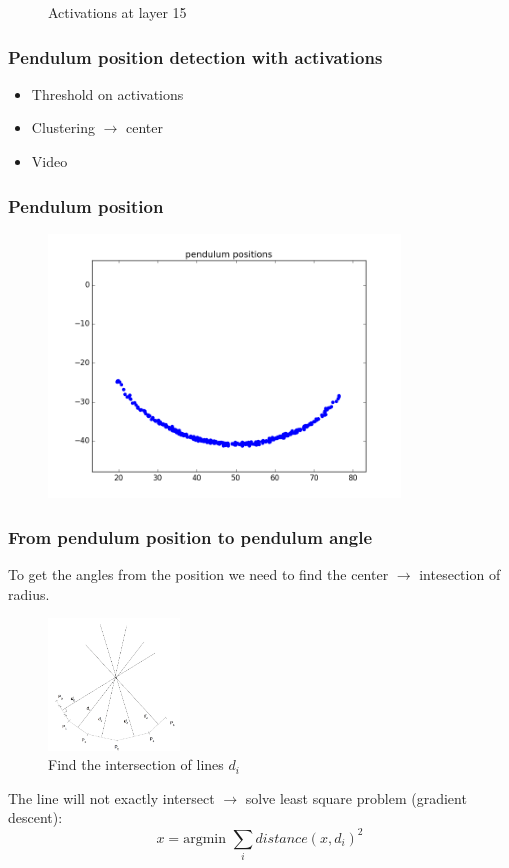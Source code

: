 \documentclass{beamer}
\begin{document}
\begin{frame}
\begin{figure}
\endminipage\hfill
  \caption{Activations at layer 15}
\end{figure}

\end{frame}

\begin{frame}
\frametitle{Pendulum position detection with activations}
\begin{itemize}
	\item Threshold on activations
	\item Clustering $\rightarrow$ center
	\item Video
\end{itemize}
\end{frame}


\begin{frame}
  \frametitle{Pendulum position}
  \begin{figure}
    \includegraphics[height=7cm]{pendulum_positions.png}
  \end{figure}
\end{frame}

\begin{frame}
\frametitle{From pendulum position to pendulum angle}
To get the angles from the position we need to find the center $\rightarrow$ intesection of radius.
\begin{figure}
  \captionsetup{labelformat=empty}
  \includegraphics[height=3.5cm]{find_center.png}
  \caption{Find the intersection of lines $d_i$}
\end{figure}
The line will not exactly intersect $\rightarrow$ solve least square problem (gradient descent):
\[
  x = \text{argmin }\sum_i distance(x, d_i)^2
\]
\end{frame}
\end{document}
